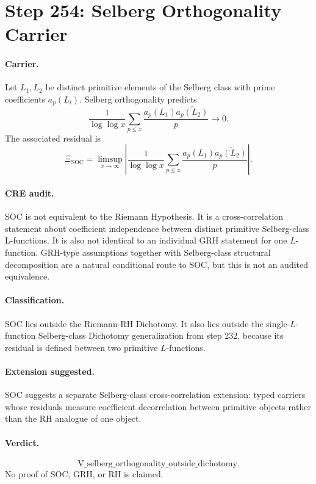 \section*{Step 254: Selberg Orthogonality Carrier}

\paragraph{Carrier.}
Let \(L_1,L_2\) be distinct primitive elements of the Selberg class with prime
coefficients \(a_p(L_i)\).  Selberg orthogonality predicts
\[
\frac{1}{\log\log x}
\sum_{p\le x}\frac{a_p(L_1)\overline{a_p(L_2)}}{p}\longrightarrow 0.
\]
The associated residual is
\[
\Xi_{\mathrm{SOC}}=
\limsup_{x\to\infty}
\left|
\frac{1}{\log\log x}
\sum_{p\le x}\frac{a_p(L_1)\overline{a_p(L_2)}}{p}
\right|.
\]

\paragraph{CRE audit.}
SOC is not equivalent to the Riemann Hypothesis.  It is a cross-correlation
statement about coefficient independence between distinct primitive
Selberg-class L-functions.  It is also not identical to an individual GRH
statement for one \(L\)-function.  GRH-type assumptions together with
Selberg-class structural decomposition are a natural conditional route to SOC,
but this is not an audited equivalence.

\paragraph{Classification.}
SOC lies outside the Riemann-RH Dichotomy.  It also lies outside the
single-\(L\)-function Selberg-class Dichotomy generalization from step 232,
because its residual is defined between two primitive \(L\)-functions.

\paragraph{Extension suggested.}
SOC suggests a separate Selberg-class cross-correlation extension: typed
carriers whose residuals measure coefficient decorrelation between primitive
objects rather than the RH analogue of one object.

\paragraph{Verdict.}
\[
\mathrm{V\_selberg\_orthogonality\_outside\_dichotomy}.
\]
No proof of SOC, GRH, or RH is claimed.
